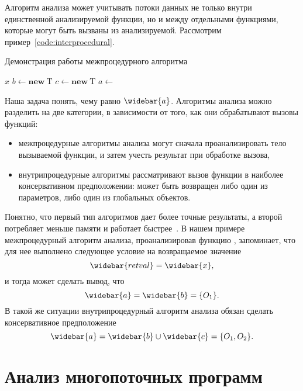 \documentclass[14pt,titlepage,draft]{extarticle}
\newcommand{\type}[1]{\mathrm{#1}}
\newcommand{\op}[1]{\mathbf{#1}}
\newcommand{\pts}[1]{\widebar{#1}}
\begin{document}
        Алгоритм анализа может учитывать потоки данных не только внутри
        единственной анализируемой функции, но и между отдельными функциями,
        которые могут быть вызваны из анализируемой.
        Рассмотрим пример~\ref{code:interprocedural}.

        \begin{algorithm}
          \caption{Демонстрация работы межпроцедурного алгоритма}
          \label{code:interprocedural}
          \begin{algorithmic}[1]
              \State \Return $x$
            \EndFunction
            \Statex
            \State $b \gets \op{new}~\type{T}$
            \State $c \gets \op{new}~\type{T}$
            \State $a \gets$ 
          \end{algorithmic}
        \end{algorithm}

        Наша задача понять, чему равно $\pts{a}$.
        Алгоритмы анализа можно разделить на две категории, в зависимости от
        того, как они обрабатывают вызовы функций:
        \begin{itemize}
          \item межпроцедурные алгоритмы анализа могут сначала проанализировать
                тело вызываемой функции, и затем учесть результат при обработке
                вызова,
          \item внутрипроцедурные алгоритмы рассматривают вызов функции в
                наиболее консервативном предположении: может быть возвращен
                либо один из параметров, либо один из глобальных объектов.
        \end{itemize}
        Понятно, что первый тип алгоритмов дает более точные результаты,
        а второй потребляет меньше памяти и работает
        быстрее~\cite[с.~117]{andersen}.
        В нашем примере межпроцедурный алгоритм анализа, проанализировав
        функцию , запоминает, что для нее выполнено следующее условие
        на возвращаемое значение
        \[\pts{retval} = \pts{x},\]
        и тогда может сделать вывод, что \[\pts{a} = \pts{b} = \{O_1\}.\]
        В такой же ситуации внутрипроцедурный алгоритм анализа обязан сделать
        консервативное предположение
        \[\pts{a} = \pts{b} \cup \pts{c} = \{O_1, O_2\}.\]

  \section{Анализ многопоточных программ}
    \label{section:intro_to_multithreading}
\end{document}
